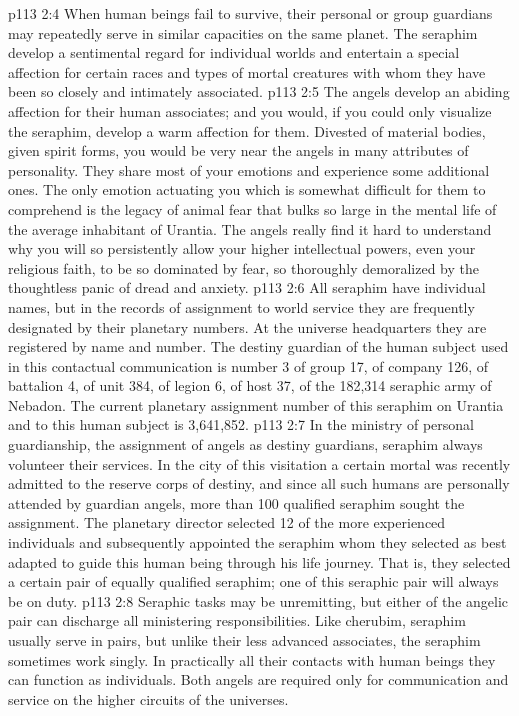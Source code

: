 \vs p113 2:4 \pc When human beings fail to survive, their personal or group guardians may repeatedly serve in similar capacities on the same planet. The seraphim develop a sentimental regard for individual worlds and entertain a special affection for certain races and types of mortal creatures with whom they have been so closely and intimately associated.
\vs p113 2:5 The angels develop an abiding affection for their human associates; and you would, if you could only visualize the seraphim, develop a warm affection for them. Divested of material bodies, given spirit forms, you would be very near the angels in many attributes of personality. They share most of your emotions and experience some additional ones. The only emotion actuating you which is somewhat difficult for them to comprehend is the legacy of animal fear that bulks so large in the mental life of the average inhabitant of Urantia. The angels really find it hard to understand why you will so persistently allow your higher intellectual powers, even your religious faith, to be so dominated by fear, so thoroughly demoralized by the thoughtless panic of dread and anxiety.
\vs p113 2:6 \pc All seraphim have individual names, but in the records of assignment to world service they are frequently designated by their planetary numbers. At the universe headquarters they are registered by name and number. The destiny guardian of the human subject used in this contactual communication is number 3 of group 17, of company 126, of battalion 4, of unit 384, of legion 6, of host 37, of the 182,314 seraphic army of Nebadon. The current planetary assignment number of this seraphim on Urantia and to this human subject is 3,641,852.
\vs p113 2:7 \pc In the ministry of personal guardianship, the assignment of angels as destiny guardians, seraphim always volunteer their services. In the city of this visitation a certain mortal was recently admitted to the reserve corps of destiny, and since all such humans are personally attended by guardian angels, more than 100 qualified seraphim sought the assignment. The planetary director selected 12 of the more experienced individuals and subsequently appointed the seraphim whom they selected as best adapted to guide this human being through his life journey. That is, they selected a certain pair of equally qualified seraphim; one of this seraphic pair will always be on duty.
\vs p113 2:8 Seraphic tasks may be unremitting, but either of the angelic pair can discharge all ministering responsibilities. Like cherubim, seraphim usually serve in pairs, but unlike their less advanced associates, the seraphim sometimes work singly. In practically all their contacts with human beings they can function as individuals. Both angels are required only for communication and service on the higher circuits of the universes.
